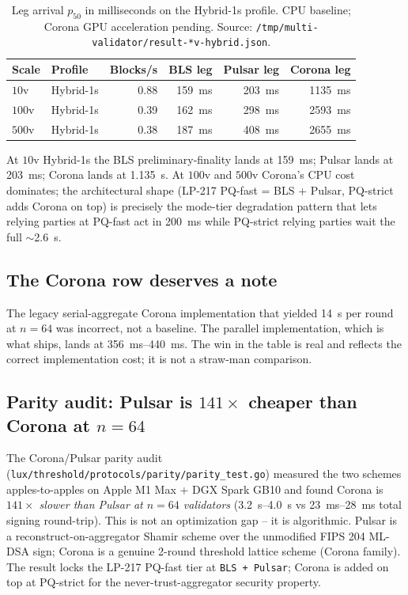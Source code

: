 \begin{table}[h]
\centering
\small
\begin{tabular}{@{}llrrrr@{}}
\toprule
\textbf{Scale} & \textbf{Profile} & \textbf{Blocks/s} & \textbf{BLS leg} & \textbf{Pulsar leg} & \textbf{Corona leg} \\
\midrule
$10$v   & Hybrid-1s & 0.88 & \SI{159}{\milli\second} & \SI{203}{\milli\second} & \SI{1135}{\milli\second} \\
$100$v  & Hybrid-1s & 0.39 & \SI{162}{\milli\second} & \SI{298}{\milli\second} & \SI{2593}{\milli\second} \\
$500$v  & Hybrid-1s & 0.38 & \SI{187}{\milli\second} & \SI{408}{\milli\second} & \SI{2655}{\milli\second} \\
\bottomrule
\end{tabular}
\caption{Leg arrival $p_{50}$ in milliseconds on the Hybrid-1s
profile. CPU baseline; Corona GPU acceleration pending. Source:
\texttt{/tmp/multi-validator/result-*v-hybrid.json}.}
\label{tab:e2e}
\end{table}

At $10$v Hybrid-1s the BLS preliminary-finality lands at
\SI{159}{\milli\second}; Pulsar lands at \SI{203}{\milli\second};
Corona lands at \SI{1.135}{\second}. At $100$v and $500$v Corona's CPU
cost dominates; the architectural shape (LP-217 PQ-fast = BLS +
Pulsar, PQ-strict adds Corona on top) is precisely the mode-tier
degradation pattern that lets relying parties at PQ-fast act in
\SI{200}{\milli\second} while PQ-strict relying parties wait the full
$\sim$\SI{2.6}{\second}.

\subsection{The Corona row deserves a note}
\label{ssec:corona-row}

The legacy serial-aggregate Corona implementation that yielded
\SI{14}{\second} per round at $n{=}64$ was incorrect, not a baseline.
The parallel implementation, which is what ships, lands at
\SI{356}{\milli\second}--\SI{440}{\milli\second}. The win in the table
is real and reflects the correct implementation cost; it is not a
straw-man comparison.

\subsection{Parity audit: Pulsar is $141\times$ cheaper than Corona at $n{=}64$}

The Corona/Pulsar parity audit
(\texttt{lux/threshold/protocols/parity/parity\_test.go}) measured
the two schemes apples-to-apples on Apple M1 Max + DGX Spark GB10 and
found Corona is \emph{$141\times$ slower than Pulsar at $n{=}64$
validators} (\SI{3.2}{\second}--\SI{4.0}{\second} vs
\SI{23}{\milli\second}--\SI{28}{\milli\second} total signing
round-trip). This is not an optimization gap -- it is algorithmic.
Pulsar is a reconstruct-on-aggregator Shamir scheme over the
unmodified FIPS 204 ML-DSA sign; Corona is a genuine 2-round
threshold lattice scheme (Corona family). The
result locks the LP-217 PQ-fast tier at \texttt{BLS + Pulsar}; Corona
is added on top at PQ-strict for the never-trust-aggregator security
property.
